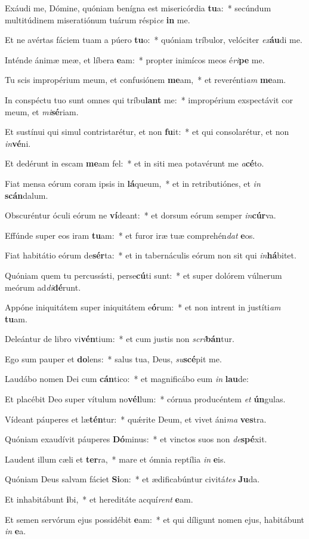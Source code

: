 \item Exáudi me, Dómine, quóniam benígna est misericórdia \textbf{tu}a:~* secúndum multitúdinem miseratiónum tuárum réspi\textit{ce} \textbf{in} me.
\item Et ne avértas fáciem tuam a púero \textbf{tu}o:~* quóniam tríbulor, velóciter \textit{ex}\textbf{áu}di me.
\item Inténde ánimæ meæ, et líbera \textbf{e}am:~* propter inimícos meos é\textit{ri}\textbf{pe} me.
\item Tu scis impropérium meum, et confusiónem \textbf{me}am,~* et reverénti\textit{am} \textbf{me}am.
\item In conspéctu tuo sunt omnes qui tríbu\textbf{lant} me:~* impropérium exspectávit cor meum, et \textit{mi}\textbf{sé}riam.
\item Et sustínui qui simul contristarétur, et non \textbf{fu}it:~* et qui consolarétur, et non \textit{in}\textbf{vé}ni.
\item Et dedérunt in escam \textbf{me}am fel:~* et in siti mea potavérunt me \textit{a}\textbf{cé}to.
\item Fiat mensa eórum coram ipsis in \textbf{lá}queum,~* et in retributiónes, et \textit{in} \textbf{scán}dalum.
\item Obscuréntur óculi eórum ne \textbf{ví}deant:~* et dorsum eórum semper \textit{in}\textbf{cúr}va.
\item Effúnde super eos iram \textbf{tu}am:~* et furor iræ tuæ comprehén\textit{dat} \textbf{e}os.
\item Fiat habitátio eórum de\textbf{sér}ta:~* et in tabernáculis eórum non sit qui \textit{in}\textbf{há}bitet.
\item Quóniam quem tu percussísti, perse\textbf{cú}ti sunt:~* et super dolórem vúlnerum meórum ad\textit{di}\textbf{dé}runt.
\item Appóne iniquitátem super iniquitátem e\textbf{ó}rum:~* et non intrent in justíti\textit{am} \textbf{tu}am.
\item Deleántur de libro vi\textbf{vén}tium:~* et cum justis non \textit{scri}\textbf{bán}tur.
\item Ego sum pauper et \textbf{do}lens:~* salus tua, Deus, \textit{su}\textbf{scé}pit me.
\item Laudábo nomen Dei cum \textbf{cán}tico:~* et magnificábo eum \textit{in} \textbf{lau}de:
\item Et placébit Deo super vítulum no\textbf{vél}lum:~* córnua producéntem \textit{et} \textbf{ún}gulas.
\item Vídeant páuperes et læ\textbf{tén}tur:~* quǽrite Deum, et vivet áni\textit{ma} \textbf{ves}tra.
\item Quóniam exaudívit páuperes \textbf{Dó}minus:~* et vinctos suos non \textit{de}\textbf{spé}xit.
\item Laudent illum cæli et \textbf{ter}ra,~* mare et ómnia reptília \textit{in} \textbf{e}is.
\item Quóniam Deus salvam fáciet \textbf{Si}on:~* et ædificabúntur civitá\textit{tes} \textbf{Ju}da.
\item Et inhabitábunt \textbf{i}bi,~* et hereditáte acquí\textit{rent} \textbf{e}am.
\item Et semen servórum ejus possidébit \textbf{e}am:~* et qui díligunt nomen ejus, habitábunt \textit{in} \textbf{e}a.
